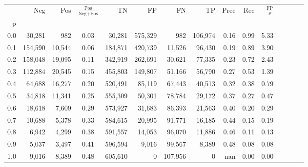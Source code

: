 \begin{tabular}{rrrcrrrrrrrrrrr}
\toprule
{} &      Neg &     Pos & $\frac{\text{Pos}}{\text{Neg}+\text{Pos}}$ &       TN &       FP &       FN &       TP &  Prec &   Rec & $\frac{\text{FP}}{\text{P}}$ \\
p   &          &         &                                            &          &          &          &          &       &       &                              \\
\midrule
0.0 &   30,281 &     982 &                                       0.03 &   30,281 &  575,329 &      982 &  106,974 &  0.16 &  0.99 &                         5.33 \\
0.1 &  154,590 &  10,544 &                                       0.06 &  184,871 &  420,739 &   11,526 &   96,430 &  0.19 &  0.89 &                         3.90 \\
0.2 &  158,048 &  19,095 &                                       0.11 &  342,919 &  262,691 &   30,621 &   77,335 &  0.23 &  0.72 &                         2.43 \\
0.3 &  112,884 &  20,545 &                                       0.15 &  455,803 &  149,807 &   51,166 &   56,790 &  0.27 &  0.53 &                         1.39 \\
0.4 &   64,688 &  16,277 &                                       0.20 &  520,491 &   85,119 &   67,443 &   40,513 &  0.32 &  0.38 &                         0.79 \\
0.5 &   34,818 &  11,341 &                                       0.25 &  555,309 &   50,301 &   78,784 &   29,172 &  0.37 &  0.27 &                         0.47 \\
0.6 &   18,618 &   7,609 &                                       0.29 &  573,927 &   31,683 &   86,393 &   21,563 &  0.40 &  0.20 &                         0.29 \\
0.7 &   10,688 &   5,378 &                                       0.33 &  584,615 &   20,995 &   91,771 &   16,185 &  0.44 &  0.15 &                         0.19 \\
0.8 &    6,942 &   4,299 &                                       0.38 &  591,557 &   14,053 &   96,070 &   11,886 &  0.46 &  0.11 &                         0.13 \\
0.9 &    5,037 &   3,497 &                                       0.41 &  596,594 &    9,016 &   99,567 &    8,389 &  0.48 &  0.08 &                         0.08 \\
1.0 &    9,016 &   8,389 &                                       0.48 &  605,610 &        0 &  107,956 &        0 &   nan &  0.00 &                         0.00 \\
\bottomrule
\end{tabular}
